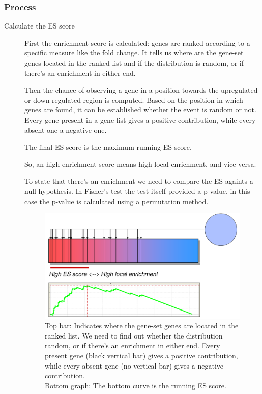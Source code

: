 		\subsubsection{Process}
		\begin{description}
		\item[Calculate the ES score]
		First the enrichment score is calculated: genes are ranked according to a specific measure like the fold change.
		It tells us where are the gene-set genes located in the ranked list and if the distribution is random, or if there's an enrichment in either end.
		
		Then the chance of observing a gene in a position towards the upregulated or down-regulated region is computed.
		Based on the position in which genes are found, it can be established whether the event is random or not.
		Every gene present in a gene list gives a positive contribution, while every absent one a negative one.
		
		The final ES score is the maximum running ES score.
		
		So, an high enrichment score means high local enrichment, and vice versa.
		
		To state that there's an enrichment we need to compare the ES againts a null hypothesis. 
		In Fisher's test the test itself provided a p-value, in this case the p-value is calculated using a permutation method.
		
		
		\begin{figure}[H]
	\centering
	\includegraphics[scale=0.2]{method1}
	\caption{Top bar: Indicates where the gene-set genes are located in the ranked list. We need to find out whether the distribution random, or if there's an enrichment in either end.
	Every present gene (black vertical bar) gives a positive contribution, while every absent gene (no vertical bar) gives a negative contribution. 
	\\
	Bottom graph: The bottom curve is the running ES score.}
	\label{fig:method1}
	\end{figure}
	

\end{description}
